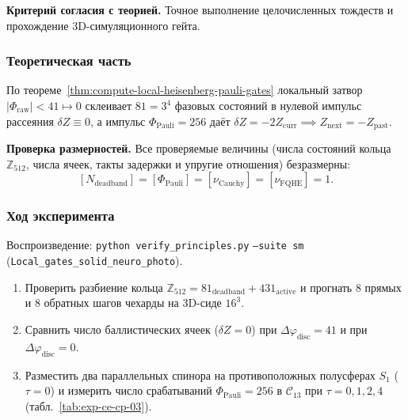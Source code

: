 \textbf{Критерий согласия с теорией.}
Точное выполнение целочисленных тождеств и прохождение 3D-симуляционного гейта.

\subsubsection*{Теоретическая часть}
По теореме~\ref{thm:compute-local-heisenberg-pauli-gates} локальный затвор $|\Phi_{\mathrm{raw}}| < 41 \mapsto 0$ склеивает $81 = 3^4$ фазовых состояний в нулевой импульс рассеяния $\delta Z \equiv 0$, а импульс $\Phi_{\mathrm{Pauli}} = 256$ даёт $\delta Z = -2Z_{\mathrm{curr}} \implies Z_{\mathrm{next}} = -Z_{\mathrm{past}}$.

\textbf{Проверка размерностей.}
Все проверяемые величины (числа состояний кольца $\mathbb{Z}_{512}$, числа ячеек, такты задержки и упругие отношения) безразмерны:
\[
  [N_{\mathrm{deadband}}] = [\Phi_{\mathrm{Pauli}}] = [\nu_{\mathrm{Cauchy}}] = [\nu_{\mathrm{FQHE}}] = 1.
\]

\subsubsection*{Ход эксперимента}
{\sloppy Воспроизведение: \texttt{python verify\_principles.py} \texttt{--suite sm} (\texttt{Local\_gates\_solid\_neuro\_photo}).\par}

\begin{enumerate}[label=\textbf{Шаг \arabic*:},leftmargin=*,itemsep=0.35em]
\item Проверить разбиение кольца $\mathbb{Z}_{512} = 81_{\mathrm{deadband}} + 431_{\mathrm{active}}$ и прогнать $8$ прямых и $8$ обратных шагов чехарды на 3D-сиде $16^3$.
\item Сравнить число баллистических ячеек ($\delta Z = 0$) при $\Delta\varphi_{\mathrm{disc}} = 41$ и при $\Delta\varphi_{\mathrm{disc}} = 0$.
\item Разместить два параллельных спинора на противоположных полусферах $S_1$ ($\tau=0$) и измерить число срабатываний $\Phi_{\mathrm{Pauli}}=256$ в $\mathcal{C}_{13}$ при $\tau=0,1,2,4$ (табл.~\ref{tab:exp-ce-cp-03}).
\end{enumerate}

